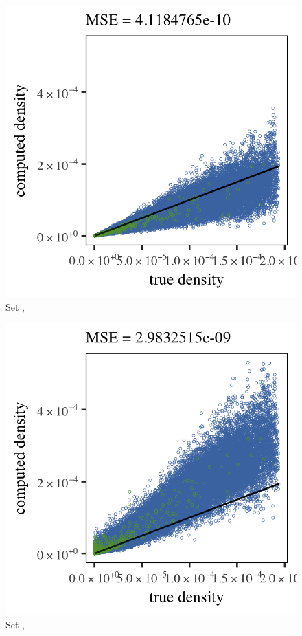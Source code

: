 
\begin{subfigure}{0.23\textwidth}
	\centering
	\includegraphics[keepaspectratio=true, width=\textwidth, height=0.23\textheight]{4/img/all/results_ferdosi_1_60000_mbe_silverman}
	\caption{Set \ferdosiOne, \mbe}
	\label{fig:4:results:mbe:ferdosi1}
\end{subfigure}
\begin{subfigure}{0.23\textwidth}
	\centering
	\includegraphics[keepaspectratio=true, width=\textwidth, height=0.23\textheight]{4/img/all/results_ferdosi_1_60000_sambe_silverman}
	\caption{Set \ferdosiOne, \sambe}
	\label{fig:4:results:sambe:ferdosi1}
\end{subfigure}
